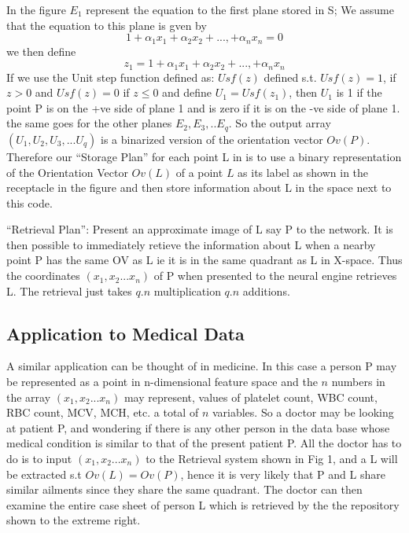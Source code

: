 \documentclass[english]{article}
\begin{document}
\medskip{}


In the figure $E_{1}$ represent the equation to the first plane stored
in S; We assume that the equation to this plane is gven by 
\begin{equation}
1+\alpha_{1}x_{1}+\alpha_{2}x_{2}+...,+\alpha_{n}x_{n}=0
\end{equation}
 we then define 
\begin{equation}
z_{1}=1+\alpha_{1}x_{1}+\alpha_{2}x_{2}+...,+\alpha_{n}x_{n}
\end{equation}
 If we use the Unit step function defined as: $Usf(z)$ defined s.t.
$Usf(z)=1$, if $z>0$ and $Usf(z)=0$ if $z\le0$ and define $U_{1}=Usf(z_{1})$,
then $U_{1}$ is 1 if the point P is on the +ve side of plane 1 and
is zero if it is on the -ve side of plane 1. the same goes for the
other planes $E_{2},E_{3},..E_{q}$. So the output array $(U_{1},U_{2},U_{3},...U_{q})$
is a binarized version of the orientation vector $Ov(P)$. Therefore
our {}``Storage Plan'' for each point L in is to use a binary representation
of the Orientation Vector $Ov(L)$ of a point $L$ as its label as
shown in the receptacle in the figure and then store information about
L in the space next to this code.

{}``Retrieval Plan'': Present an approximate image of L say P to
the network. It is then possible to immediately retieve the information
about L when a nearby point P has the same OV as L ie it is in the
same quadrant as L in X-space. Thus the coordinates $(x_{1},x_{2}...x_{n})$
of P when presented to the neural engine retrieves L. The retrieval
just takes $q.n$ multiplication $q.n$ additions. 


\subsection{Application to Medical Data}

A similar application can be thought of in medicine. In this case
a person P may be represented as a point in n-dimensional feature
space and the $n$ numbers in the array $(x_{1},x_{2}...x_{n})$ may
represent, values of platelet count, WBC count, RBC count, MCV, MCH,
etc. a total of $n$ variables. So a doctor may be looking at patient
P, and wondering if there is any other person in the data base whose
medical condition is similar to that of the present patient P. All
the doctor has to do is to input $(x_{1},x_{2}...x_{n})$ to the Retrieval
system shown in Fig 1, and a L will be extracted s.t $Ov(L)=Ov(P)$,
hence it is very likely that P and L share similar ailments since
they share the same quadrant. The doctor can then examine the entire
case sheet of person L which is retrieved by the the repository shown
to the extreme right.
\end{document}
